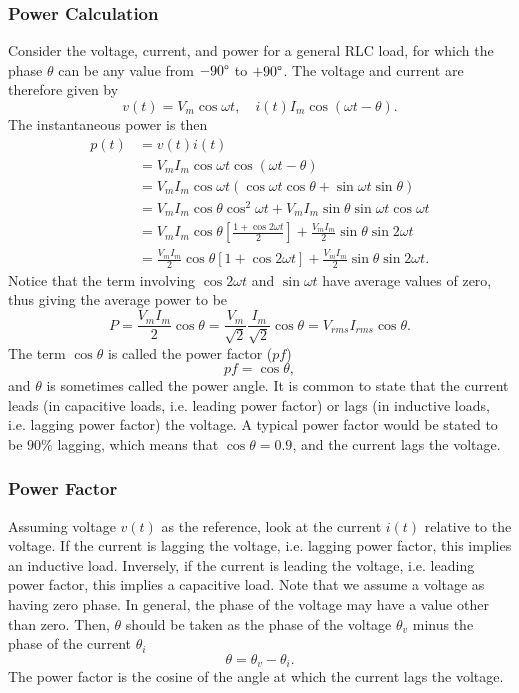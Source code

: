 \documentclass{article}
\begin{document}
\subsubsection{Power Calculation}
Consider the voltage, current, and power for a general RLC load, for which the phase $\theta $ can be any value from $-90\degree$ to $+90\degree$. The voltage and current are therefore given by 
\[
    v(t)=V_m\cos\omega t,\quad i(t)I_m\cos \left( \omega t-\theta  \right).
\]
The instantaneous power is then
\begin{align*}
    p(t) &= v(t)i(t)\\
         &=V_mI_m\cos\omega t\cos \left( \omega t-\theta  \right)\\
         &=V_mI_m\cos\omega t \left( \cos\omega t\cos\theta  +\sin\omega t\sin\theta \right)\\
         &=V_mI_m\cos\theta \cos^2\omega t+V_mI_m\sin\theta \sin\omega t\cos\omega t\\
         &=V_mI_m\cos\theta \left[ \frac{1+\cos 2\omega t}{2} \right]+\frac{V_mI_m}{2}\sin\theta \sin 2\omega t\\
         &= \frac{V_mI_m}{2}\cos\theta \left[ 1+\cos 2\omega t \right]+\frac{V_mI_m}{2}\sin\theta \sin 2\omega t.
\end{align*}
Notice that the term involving $\cos 2\omega t$ and $\sin \omega t$ have average values of zero, thus giving the average power to be 
\[
    P=\frac{V_mI_m}{2}\cos\theta =\frac{V_m}{\sqrt{2}}\frac{I_m}{\sqrt{2}}\cos\theta =V_{rms}I_{rms}\cos\theta .
\]
The term $\cos\theta $ is called the power factor ($pf$) 
\[
    pf=\cos\theta ,
\]
and $\theta $ is sometimes called the power angle. It is common to state that the current leads (in capacitive loads, i.e. leading power factor) or lags (in inductive loads, i.e. lagging power factor) the voltage. A typical power factor would be stated to be $90\%$ lagging, which means that $\cos\theta =0.9$, and the current lags the voltage.

\subsubsection{Power Factor}
Assuming voltage $v(t)$ as the reference, look at the current $i(t)$ relative to the voltage. If the current is lagging the voltage, i.e. lagging power factor, this implies an inductive load. Inversely, if the current is leading the voltage, i.e. leading power factor, this implies a capacitive load. Note that we assume a voltage as having zero phase. In general, the phase of the voltage may have a value other than zero. Then, $\theta $ should be taken as the phase of the voltage $\theta _v$ minus the phase of the current $\theta _i$ 
\[
    \theta =\theta _v-\theta _i.
\]
The power factor is the cosine of the angle at which the current lags the voltage.
\end{document}
